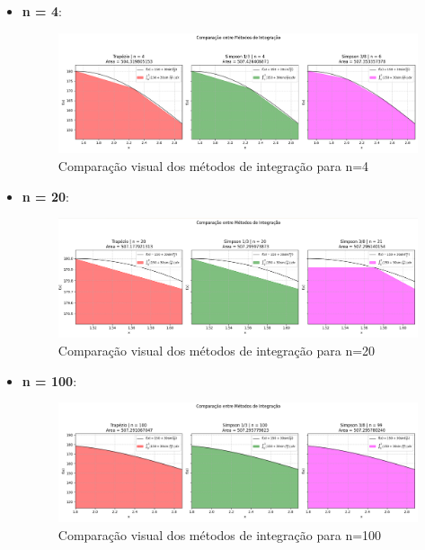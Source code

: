 \documentclass{article}
\begin{document}
\begin{itemize}
    \item \textbf{n = 4}:
    \begin{figure}[H]
        \centering
        \includegraphics[width=1.0\textwidth, height=0.4\textheight, keepaspectratio]{n4.png}
        \caption{\small Comparação visual dos métodos de integração para n=4}\label{fig:n4}
    \end{figure}
    

    \item \textbf{n = 20}:
    \vspace{-1cm}
    \begin{figure}[H]
        \centering
        \includegraphics[width=1\textwidth, height=0.3\textheight, keepaspectratio]{n20.png}
        \caption{Comparação visual dos métodos de integração para n=20}\label{fig:n20}
    \end{figure}
    
    \item \textbf{n = 100}:
    \begin{figure}[H]
        \centering
        \includegraphics[width=1\textwidth, height=0.3\textheight, keepaspectratio]{n100.png}
        \caption{Comparação visual dos métodos de integração para n=100}\label{fig:n100}
    \end{figure}


\end{itemize}
\end{document}
